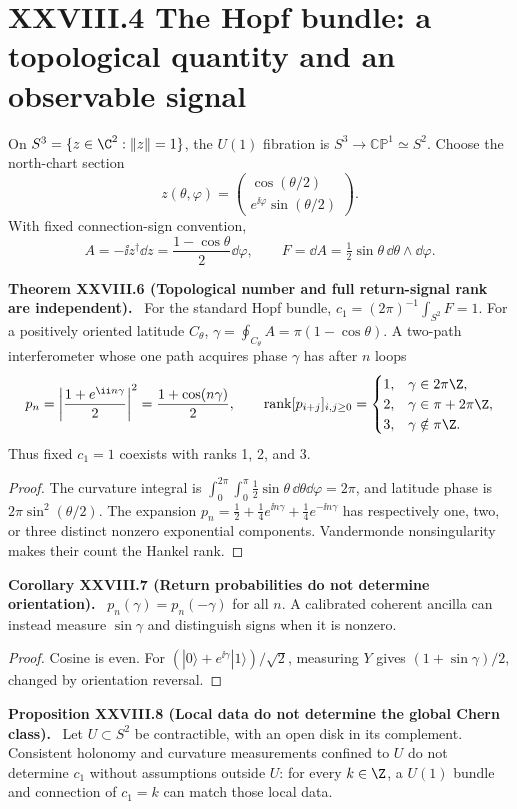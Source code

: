 \documentclass[11pt,a4paper,oneside]{book}
\DeclareMathOperator{\rank}{rank}\DeclareMathOperator{\Tr}{Tr}
\newcommand{\statement}[3]{\par\medskip\noindent\textbf{#1 #2 (#3).}\ }
\begin{document}
\section*{XXVIII.4 The Hopf bundle: a topological quantity and an observable signal}
On $S^3=\{z\in\C^2:\|z\|=1\}$, the $U(1)$ fibration is $S^3\to\mathbb{CP}^1\simeq S^2$. Choose the north-chart section
\[z(\theta,\varphi)=\begin{pmatrix}\cos(\theta/2)\\e^{\ii\varphi}\sin(\theta/2)\end{pmatrix}.\]
With fixed connection-sign convention,
\[A=-\ii z^\dagger\dd z=\frac{1-\cos\theta}{2}\dd\varphi,\qquad F=\dd A=\tfrac12\sin\theta\,\dd\theta\wedge\dd\varphi.\]
\statement{Theorem}{XXVIII.6}{Topological number and full return-signal rank are independent} For the standard Hopf bundle, $c_1=(2\pi)^{-1}\int_{S^2}F=1$. For a positively oriented latitude $C_\theta$, $\gamma=\oint_{C_\theta}A=\pi(1-\cos\theta)$. A two-path interferometer whose one path acquires phase $\gamma$ has after $n$ loops
\[p_n=\left|\frac{1+e^{\ii n\gamma}}2\right|^2=\frac{1+\cos(n\gamma)}2,\qquad
\rank[p_{i+j}]_{i,j\ge0}=\begin{cases}1,&\gamma\in2\pi\Z,\\2,&\gamma\in\pi+2\pi\Z,\\3,&\gamma\notin\pi\Z.\end{cases}\]
Thus fixed $c_1=1$ coexists with ranks 1, 2, and 3.
\begin{proof}The curvature integral is $\int_0^{2\pi}\int_0^\pi\frac12\sin\theta\,\dd\theta\dd\varphi=2\pi$, and latitude phase is $2\pi\sin^2(\theta/2)$. The expansion $p_n=\frac12+\frac14e^{\ii n\gamma}+\frac14e^{-\ii n\gamma}$ has respectively one, two, or three distinct nonzero exponential components. Vandermonde nonsingularity makes their count the Hankel rank.\end{proof}
\statement{Corollary}{XXVIII.7}{Return probabilities do not determine orientation} $p_n(\gamma)=p_n(-\gamma)$ for all $n$. A calibrated coherent ancilla can instead measure $\sin\gamma$ and distinguish signs when it is nonzero.
\begin{proof}Cosine is even. For $(|0\rangle+e^{\ii\gamma}|1\rangle)/\sqrt2$, measuring $Y$ gives $(1+\sin\gamma)/2$, changed by orientation reversal.\end{proof}
\statement{Proposition}{XXVIII.8}{Local data do not determine the global Chern class} Let $U\subset S^2$ be contractible, with an open disk in its complement. Consistent holonomy and curvature measurements confined to $U$ do not determine $c_1$ without assumptions outside $U$: for every $k\in\Z$, a $U(1)$ bundle and connection of $c_1=k$ can match those local data.
\end{document}
